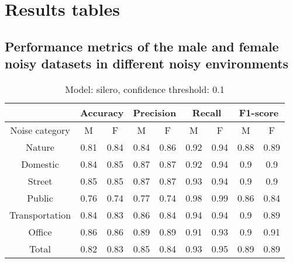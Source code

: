 \documentclass[../main.tex]{subfiles}
\begin{document}
\section{Results tables}
\label{appendix_A}
\subsection{Performance metrics of the male and female noisy datasets in different noisy environments}

\begin{table}[H]
    \centering
    \small
    \begin{tabular}{ |c|c|c|c|c|c|c|c|c| }
    \hline
     &\multicolumn{2}{|c|}{Accuracy}&\multicolumn{2}{|c|}{Precision}&\multicolumn{2}{|c|}{Recall}&\multicolumn{2}{|c|}{F1-score} \\ 
    \hline
    Noise category & M & F & M & F & M & F & M & F \\ 
    \hline
    Nature & 0.81 & 0.84 & 0.84 & 0.86 & 0.92 & 0.94 & 0.88 & 0.89 \\ 
    Domestic & 0.84 & 0.85 & 0.87 & 0.87 & 0.92 & 0.94 & 0.9 & 0.9 \\ 
    Street & 0.85 & 0.85 & 0.87 & 0.87 & 0.93 & 0.94 & 0.9 & 0.9 \\ 
    Public & 0.76 & 0.74 & 0.77 & 0.74 & 0.98 & 0.99 & 0.86 & 0.84 \\ 
    Transportation & 0.84 & 0.83 & 0.86 & 0.84 & 0.94 & 0.94 & 0.9 & 0.89 \\ 
    Office & 0.86 & 0.86 & 0.89 & 0.89 & 0.91 & 0.93 & 0.9 & 0.91 \\ 
    Total & 0.82 & 0.83 & 0.85 & 0.84 & 0.93 & 0.95 & 0.89 & 0.89 \\ 
    \hline
    \end{tabular}
    \caption{Model: silero, confidence threshold: 0.1}
    \end{table}
    
\end{document}
